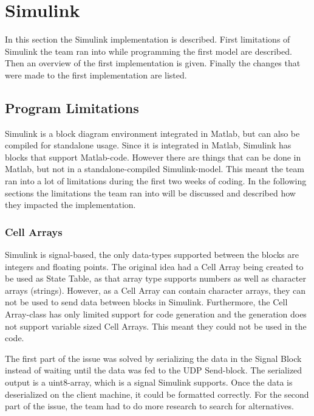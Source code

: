 \section{Simulink}\label{sec:simulink}
In this section the Simulink implementation is described. First limitations of Simulink the team ran into while programming the first model are described. Then an overview of the first implementation is given. Finally the changes that were made to the first implementation are listed. 

\subsection{Program Limitations}\label{sec:simprolim}
Simulink is a block diagram environment integrated in Matlab, but can also be compiled for standalone usage. Since it is integrated in Matlab, Simulink has blocks that support Matlab-code. However there are things that can be done in Matlab, but not in a standalone-compiled Simulink-model. This meant the team ran into a lot of limitations during the first two weeks of coding. In the following sections the limitations the team ran into will be discussed and described how they impacted the implementation.

\subsubsection{Cell Arrays}
Simulink is signal-based, the only data-types supported between the blocks are integers and floating points. The original idea had a Cell Array being created to be used as State Table, as that array type supports numbers as well as character arrays (strings). However, as a Cell Array can contain character arrays, they can not be used to send data between blocks in Simulink. Furthermore, the Cell Array-class has only limited support for code generation and the generation does not support variable sized Cell Arrays. This meant they could not be used in the code.

The first part of the issue was solved by serializing the data in the Signal Block instead of waiting until the data was fed to the UDP Send-block. The serialized output is a uint8-array, which is a signal Simulink supports. Once the data is deserialized on the client machine, it could be formatted correctly. For the second part of the issue, the team had to do more research to search for alternatives.

